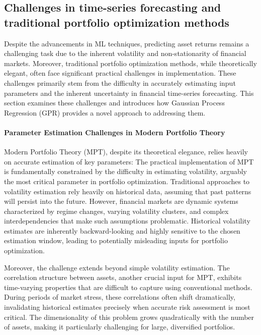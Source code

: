 \subsection{Challenges in time-series forecasting and traditional portfolio optimization methods}
Despite the advancements in ML techniques, predicting asset returns remains a challenging task due to the inherent volatility and non-stationarity of financial markets.
Moreover, traditional portfolio optimization methods, while theoretically elegant, often face significant practical challenges in implementation. These challenges primarily stem from the difficulty in accurately estimating input parameters and the inherent uncertainty in financial time-series forecasting. 
This section examines these challenges and introduces how Gaussian Process Regression (GPR) provides a novel approach to addressing them.

\paragraph{Parameter Estimation Challenges in Modern Portfolio Theory}
Modern Portfolio Theory (MPT), despite its theoretical elegance, relies heavily on accurate estimation of key parameters:
The practical implementation of MPT is fundamentally constrained by the difficulty in estimating volatility, arguably the most critical parameter in portfolio optimization. Traditional approaches to volatility estimation rely heavily on historical data, assuming that past patterns will persist into the future. However, financial markets are dynamic systems characterized by regime changes, varying volatility clusters, and complex interdependencies that make such assumptions problematic. Historical volatility estimates are inherently backward-looking and highly sensitive to the chosen estimation window, leading to potentially misleading inputs for portfolio optimization.

Moreover, the challenge extends beyond simple volatility estimation. The correlation structure between assets, another crucial input for MPT, exhibits time-varying properties that are difficult to capture using conventional methods. During periods of market stress, these correlations often shift dramatically, invalidating historical estimates precisely when accurate risk assessment is most critical. The dimensionality of this problem grows quadratically with the number of assets, making it particularly challenging for large, diversified portfolios.

